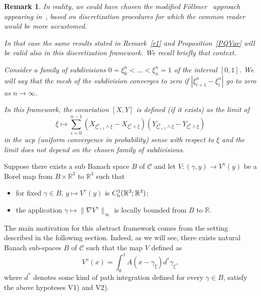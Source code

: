 \documentclass[a4paper,12pt,reqno]{amsart}
\newcommand{\R}{\mathbb{R}}
\newtheorem{remark}{Remark}
\newcommand{\CC}{\mathscr{C}}
\begin{document}
\begin{remark} \label{r2}
In reality, we could have chosen the modified F\"ollmer~\cite{fo} approach
appearing in~\cite{erv}, based on discretization procedures for which the common reader
would be more accustomed.

In that  case the same results stated in Remark~\ref{r1} and
Proposition~\ref{PQVar} will be valid also in this discretization framework.
We recall briefly that context.

Consider a family of subdivisions
$ 0 = \xi^n_0 <  \ldots < \xi^n_n =  1 $ of the interval $[0,1]$.
We will say that the mesh of the subdivision converges to  zero
if $|\xi^n_{i+1} -  \xi^n_{i}| $ go to zero as $n \to \infty$.

 In this framework,  the covariation  $[X,Y]$ is defined (if it exists) as the limit
of 
$$ \xi \mapsto \sum_{i=0}^{n-1}  (X_{\xi^n_{i+1} \wedge \xi }- X_{\xi^n_{i} \wedge \xi}) (Y_{\xi^n_{i+1} \wedge \xi}- Y_{\xi^n_{i} \wedge \xi}) $$
 in the ucp (uniform convergence in probability) 
sense with respect to $\xi$ 
and the limit does not depend on the chosen family of subdivisions. 
\end{remark}

\medskip
 
Suppose there exists a sub Banach space $B$ of  $\CC$ 
and let $V : (\gamma, y) \rightarrow V^\gamma (y)$
 be  a Borel map 
from $B  \times  \R^3$ to $\R^3$ such that 
\begin{itemize} \label{Ass}
\item[V1)] for fixed $ \gamma \in B  $,
$ y \mapsto V^\gamma (y)$   is $C^1_{\rm b} (\R^3; \R^3 )$;
\item[V2)] the application
$\gamma  \mapsto \|\nabla V ^\gamma\|_\infty$   is locally bounded from
$B$ to $\R$.
\end{itemize} 

The main motivation for this abstract framework comes from the setting
described in the following section. Indeed, as we will see, there
exists natural Banach sub-spaces $B$ of $\CC$ such that the map
$V$ defined as
$$ V^\gamma(x) = \int_0^1 A(x - \gamma_\xi) d^* \gamma_\xi,  $$
where $d^*$ denotes some kind of path integration defined for every
$\gamma \in B$, satisfy the above hypoteses V1) and V2). 
\end{document}

